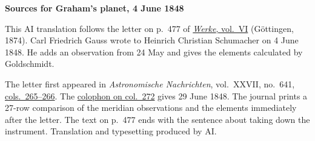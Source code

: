 \clearpage\thispagestyle{empty}
\begin{center}\textbf{Sources for Graham’s planet, 4 June 1848}\end{center}
\noindent This AI translation follows the letter on p.~477 of \href{https://gdz.sub.uni-goettingen.de/id/PPN236007467}{\textit{Werke}, vol.~VI} (Göttingen, 1874). Carl Friedrich Gauss wrote to Heinrich Christian Schumacher on 4 June 1848. He adds an observation from 24 May and gives the elements calculated by Goldschmidt.
\par\smallskip\noindent The letter first appeared in \textit{Astronomische Nachrichten}, vol.~XXVII, no.~641, \href{https://api.digitale-sammlungen.de/iiif/image/v2/bsb10049452_00141/full/1800,/0/default.jpg}{cols.~265--266}. The \href{https://api.digitale-sammlungen.de/iiif/image/v2/bsb10049452_00144/full/1800,/0/default.jpg}{colophon on col.~272} gives 29 June 1848. The journal prints a 27-row comparison of the meridian observations and the elements immediately after the letter. The text on p.~477 ends with the sentence about taking down the instrument. Translation and typesetting produced by AI.
\clearpage
